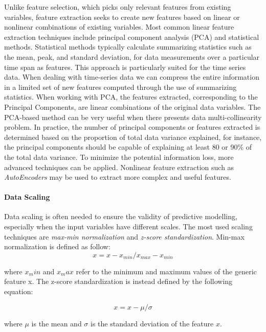 Unlike feature selection, which picks only relevant features from existing variables, feature extraction seeks to create new features based on linear or nonlinear combinations of existing variables. Most common linear feature extraction techniques include principal component analysis (PCA) and statistical methods. Statistical methods typically calculate summarizing statistics such as the mean, peak, and standard deviation, for data measurements over a particular time span as features. This approach is particularly suited for the time series data. When dealing with time-series data we can compress the entire information in a limited set of new features computed through the use of summarizing statistics. When working with PCA, the features extracted, corresponding to the Principal Components, are linear combinations of the original data variables. The PCA-based method can be very useful when there presents data multi-collinearity problem. In practice, the number of principal components or features extracted is determined based on the proportion of total data variance explained, for instance, the principal components should be capable of explaining at least 80 or 90\% of the total data variance. To minimize the potential information loss, more advanced techniques can be applied. Nonlinear feature extraction such as \textit{AutoEncoders} may be used to extract more complex and useful features.


\paragraph{Data Scaling}

Data scaling is often needed to ensure the validity of predictive modelling, especially when the input variables have different scales. The most used scaling techniques are \textit{max-min normalization} and \textit{z-score standardization}. Min-max normalization is defined as follow:
\begin{equation}
    x = x - x_{min} / x_{max} - x_{min}
\end{equation}

where $x_min$ and $x_max$ refer to the minimum and maximum values of the generic feature x. The z-score standardization is instead defined by the following equation:

\begin{equation}
    x = x - \mu / \sigma
\end{equation}

where $\mu$ is the mean and $\sigma$ is the standard deviation of the feature $x$.

